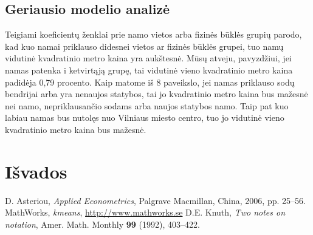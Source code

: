 \documentclass[a4paper]{article}
\begin{document}
\subsection{Geriausio modelio analizė}
\hspace*{0,52cm}Teigiami koeficientų ženklai prie namo vietos arba fizinės būklės grupių parodo, kad kuo namai priklauso didesnei vietos ar fizinės būklės grupei, tuo namų vidutinė kvadratinio metro kaina yra aukštesnė. Mūsų atveju, pavyzdžiui, jei namas patenka i ketvirtąją grupę, tai vidutinė vieno kvadratinio metro kaina padidėja 0,79 procento. Kaip matome iš 8 paveikslo, jei namas priklauso sodų bendrijai arba yra nenaujos statybos, tai jo kvadratinio metro kaina bus mažesnė nei namo, nepriklausančio sodams arba naujos statybos namo. Taip pat kuo labiau namas bus nutolęs nuo Vilniaus miesto centro, tuo jo vidutinė vieno kvadratinio metro kaina bus mažesnė. 

\newpage
\section{Išvados}

\newpage
\renewcommand{\refname}{\section{Literatūra}}
\begin{thebibliography}{3}
 D. Asteriou, \emph{Applied Econometrics}, Palgrave Macmillan, China, 2006, pp. 25--56.
MathWorks, \emph{kmeans}, \url{http://www.mathworks.se}
 D.E. Knuth, \emph{Two notes on notation}, Amer.
Math. Monthly \textbf{99} (1992), 403--422.
\end{thebibliography}
\end{document}
